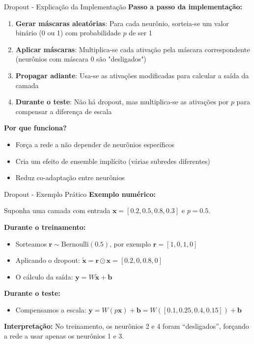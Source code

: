 \documentclass{beamer}
\begin{document}
\begin{frame}{Dropout - Explicação da Implementação}
\textbf{Passo a passo da implementação:}
\vspace{0.3cm}

\begin{enumerate}
    \item \textbf{Gerar máscaras aleatórias}: Para cada neurônio, sorteia-se um valor binário (0 ou 1) com probabilidade $p$ de ser 1
    \item \textbf{Aplicar máscaras}: Multiplica-se cada ativação pela máscara correspondente (neurônios com máscara 0 são "desligados")
    \item \textbf{Propagar adiante}: Usa-se as ativações modificadas para calcular a saída da camada
    \item \textbf{Durante o teste}: Não há dropout, mas multiplica-se as ativações por $p$ para compensar a diferença de escala
\end{enumerate}

\vspace{0.3cm}
\textbf{Por que funciona?}
\begin{itemize}
    \item Força a rede a não depender de neurônios específicos
    \item Cria um efeito de ensemble implícito (várias subredes diferentes)
    \item Reduz co-adaptação entre neurônios
\end{itemize}
\end{frame}

\begin{frame}{Dropout - Exemplo Prático}
\textbf{Exemplo numérico:}
\vspace{0.2cm}

Suponha uma camada com entrada $\mathbf{x} = [0.2, 0.5, 0.8, 0.3]$ e $p = 0.5$.

\vspace{0.2cm}
\textbf{Durante o treinamento:}
\begin{itemize}
    \item Sorteamos $\mathbf{r} \sim \text{Bernoulli}(0.5)$, por exemplo $\mathbf{r} = [1, 0, 1, 0]$
    \item Aplicando o dropout: $\tilde{\mathbf{x}} = \mathbf{r} \odot \mathbf{x} = [0.2, 0, 0.8, 0]$
    \item O cálculo da saída: $\mathbf{y} = W\tilde{\mathbf{x}} + \mathbf{b}$
\end{itemize}

\vspace{0.2cm}
\textbf{Durante o teste:}
\begin{itemize}
    \item Compensamos a escala: $\mathbf{y} = W(p\mathbf{x}) + \mathbf{b} = W([0.1, 0.25, 0.4, 0.15]) + \mathbf{b}$
\end{itemize}

\vspace{0.2cm}
\textbf{Interpretação:} No treinamento, os neurônios 2 e 4 foram ``desligados'', forçando a rede a usar apenas os neurônios 1 e 3.
\end{frame}
\end{document}
